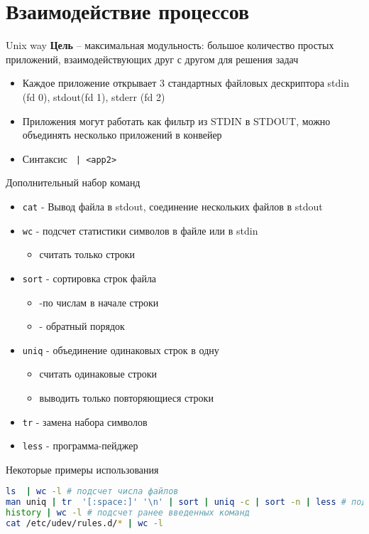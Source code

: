 \documentclass[ignorenonframetext, professionalfonts, hyperref={pdftex, unicode}]{beamer}
\begin{document}
\section{Взаимодействие процессов}
\begin{frame}{Unix way}
  \textbf{Цель} -- максимальная модульность: большое количество простых приложений, взаимодействующих друг с другом для решения задач
  \begin{itemize}
    \item Каждое приложение открывает 3 стандартных файловых дескриптора stdin (fd 0), stdout(fd 1), stderr (fd 2)
    \item Приложения могут работать как фильтр из STDIN в STDOUT, можно объединять несколько приложений в конвейер
    \item Синтаксис {\tt <app1> | <app2>}
  \end{itemize}
\end{frame}
\begin{frame}{Дополнительный набор команд}
 \begin{itemize}
  \item {\tt cat} - Вывод файла в stdout, соединение нескольких файлов в stdout
  \item {\tt wc} - подсчет статистики символов в файле или в stdin 
    \begin{itemize}
      \item[-l] считать только строки
    \end{itemize}
  \item {\tt sort} - сортировка строк файла
    \begin{itemize}
      \item[-n] -по числам в начале строки
      \item[-r] - обратный порядок
    \end{itemize}
  \item {\tt uniq} - объединение одинаковых строк в одну
    \begin{itemize}
      \item[-c] считать одинаковые строки
      \item[-d] выводить только повторяющиеся строки
    \end{itemize}
  \item {\tt tr} - замена набора символов
  \item {\tt less} - программа-пейджер
 \end{itemize}
\end{frame}
\begin{frame}[fragile]{Некоторые примеры использования}
\begin{lstlisting}[language=bash]
ls  | wc -l # подсчет числа файлов
man uniq | tr  '[:space:]' '\n' | sort | uniq -c | sort -n | less # подсчет количества слов в тексте man uniq
history | wc -l # подсчет ранее введенных команд
cat /etc/udev/rules.d/* | wc -l
\end{lstlisting}
\end{frame}
\end{document}
